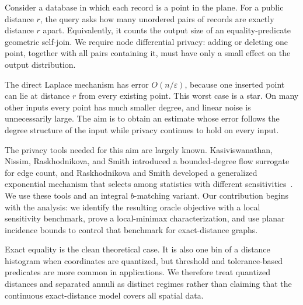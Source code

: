 \documentclass[11pt]{article}
\newcommand{\eps}{\varepsilon}
\begin{document}
Consider a database in which each record is a point in the plane. For a public distance \(r\), the query asks how many unordered pairs of records are exactly distance \(r\) apart. Equivalently, it counts the output size of an equality-predicate geometric self-join. We require node differential privacy: adding or deleting one point, together with all pairs containing it, must have only a small effect on the output distribution.

The direct Laplace mechanism has error \(O(n/\eps)\), because one inserted point can lie at distance \(r\) from every existing point. This worst case is a star. On many other inputs every point has much smaller degree, and linear noise is unnecessarily large. The aim is to obtain an estimate whose error follows the degree structure of the input while privacy continues to hold on every input.

The privacy tools needed for this aim are largely known. Kasiviswanathan, Nissim, Raskhodnikova, and Smith introduced a bounded-degree flow surrogate for edge count, and Raskhodnikova and Smith developed a generalized exponential mechanism that selects among statistics with different sensitivities~\cite{KNRS13,RS16}. We use these tools and an integral \(b\)-matching variant. Our contribution begins with the analysis: we identify the resulting oracle objective with a local sensitivity benchmark, prove a local-minimax characterization, and use planar incidence bounds to control that benchmark for exact-distance graphs.

Exact equality is the clean theoretical case. It is also one bin of a distance histogram when coordinates are quantized, but threshold and tolerance-based predicates are more common in applications. We therefore treat quantized distances and separated annuli as distinct regimes rather than claiming that the continuous exact-distance model covers all spatial data.
\end{document}
